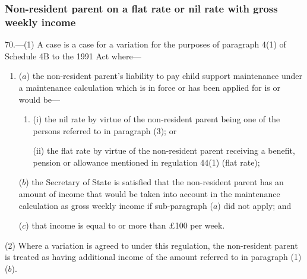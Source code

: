 \documentclass[12pt,a4paper]{article}
\begin{document}

\subsubsection[70. Non-resident parent on a flat rate or nil rate with gross weekly income]{Non-resident parent on a flat rate or nil rate with gross weekly income}

70.---(1)  A case is a case for a variation for the purposes of paragraph 4(1) of Schedule 4B to the 1991 Act where—
\begin{enumerate}\item[]
($a$) the non-resident parent’s liability to pay child support maintenance under a maintenance calculation which is in force or has been applied for is or would be—
\begin{enumerate}\item[]
(i) the nil rate by virtue of the non-resident parent being one of the persons referred to in paragraph (3); or

(ii) the flat rate by virtue of the non-resident parent receiving a benefit, pension or allowance mentioned in regulation 44(1) (flat rate);
\end{enumerate}

($b$) the Secretary of State is satisfied that the non-resident parent has an amount of income that would be taken into account in the maintenance calculation as gross weekly income if sub-paragraph ($a$)  did not apply; and

($c$) that income is 
equal to or  %
more than £100 per week.
\end{enumerate}

(2) Where a variation is agreed to under this regulation, the non-resident parent is treated as having additional income of the amount referred to in paragraph (1)($b$).
\end{document}
